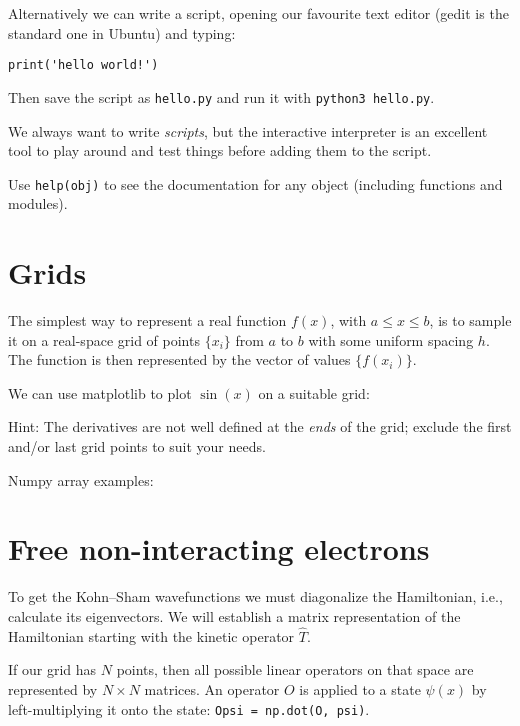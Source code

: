 \documentclass{article}
\begin{document}
Alternatively we can write a script, opening our favourite text editor (gedit is the standard one in Ubuntu) and typing:
\begin{lstlisting}
print('hello world!')
\end{lstlisting}
Then save the script as \texttt{hello.py} and run it with
\texttt{python3 hello.py}.

We always want to write \emph{scripts},
but the interactive interpreter is an excellent tool to play around and test
things before adding them to the script.

Use \lstinline{help(obj)} to see the documentation for any object
(including functions and modules).

\section*{Grids}
The simplest way to represent a real function $f(x)$,
with $a \le x \le b$, is to
sample it on a real-space grid of points $\{x_i\}$ from $a$ to $b$ with some
uniform spacing $h$.
The function is then represented by the vector of values $\{f(x_i)\}$.

\noindent We can use matplotlib to plot $\sin(x)$ on a suitable grid:




Hint: The derivatives are not well defined at the \emph{ends} of the grid;
exclude the first and/or last grid points to suit your needs.

\noindent Numpy array examples:


\section*{Free non-interacting electrons}

To get the Kohn--Sham wavefunctions we must diagonalize the
Hamiltonian, i.e., calculate its eigenvectors.  We will establish a matrix
representation of the Hamiltonian starting with the kinetic operator
$\hat T$.

If our grid has $N$ points, then all possible linear operators on that
space are represented by $N\times N$ matrices.  An operator $O$ is
applied to a state $\psi(x)$ by left-multiplying it onto the state:
\texttt{Opsi = np.dot(O, psi)}.
\end{document}
